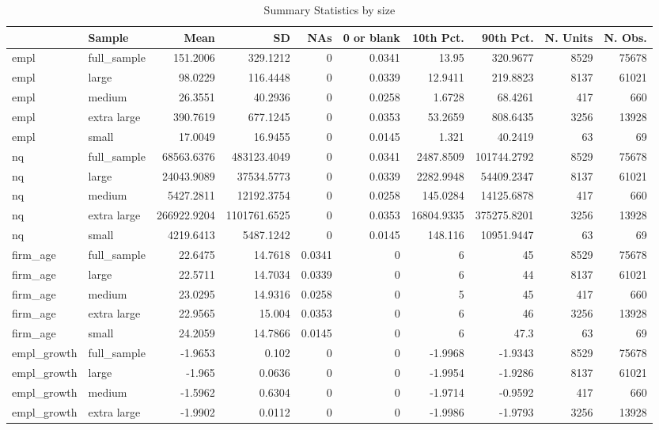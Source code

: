 \begin{table}[h]
  \caption{Summary Statistics by size }
  \centering
\begin{tabular}{l lr r r r r r r r}
\hline
 & Sample &Mean &SD &NAs &0 or blank &10th Pct. &90th Pct. &N. Units &N. Obs.\\
\hline
empl & full\_sample & 151.2006 & 329.1212 & 0 & 0.0341 & 13.95 & 320.9677 & 8529&75678\\
empl & large & 98.0229 & 116.4448 & 0 & 0.0339 & 12.9411 & 219.8823 & 8137&61021\\
empl & medium & 26.3551 & 40.2936 & 0 & 0.0258 & 1.6728 & 68.4261 & 417&660\\
empl & extra large & 390.7619 & 677.1245 & 0 & 0.0353 & 53.2659 & 808.6435 & 3256&13928\\
empl & small & 17.0049 & 16.9455 & 0 & 0.0145 & 1.321 & 40.2419 & 63&69\\
\hline
nq & full\_sample & 68563.6376 & 483123.4049 & 0 & 0.0341 & 2487.8509 & 101744.2792 & 8529&75678\\
nq & large & 24043.9089 & 37534.5773 & 0 & 0.0339 & 2282.9948 & 54409.2347 & 8137&61021\\
nq & medium & 5427.2811 & 12192.3754 & 0 & 0.0258 & 145.0284 & 14125.6878 & 417&660\\
nq & extra large & 266922.9204 & 1101761.6525 & 0 & 0.0353 & 16804.9335 & 375275.8201 & 3256&13928\\
nq & small & 4219.6413 & 5487.1242 & 0 & 0.0145 & 148.116 & 10951.9447 & 63&69\\
\hline
firm\_age & full\_sample & 22.6475 & 14.7618 & 0.0341 & 0 & 6 & 45 & 8529&75678\\
firm\_age & large & 22.5711 & 14.7034 & 0.0339 & 0 & 6 & 44 & 8137&61021\\
firm\_age & medium & 23.0295 & 14.9316 & 0.0258 & 0 & 5 & 45 & 417&660\\
firm\_age & extra large & 22.9565 & 15.004 & 0.0353 & 0 & 6 & 46 & 3256&13928\\
firm\_age & small & 24.2059 & 14.7866 & 0.0145 & 0 & 6 & 47.3 & 63&69\\
\hline
empl\_growth & full\_sample & -1.9653 & 0.102 & 0 & 0 & -1.9968 & -1.9343 & 8529&75678\\
empl\_growth & large & -1.965 & 0.0636 & 0 & 0 & -1.9954 & -1.9286 & 8137&61021\\
empl\_growth & medium & -1.5962 & 0.6304 & 0 & 0 & -1.9714 & -0.9592 & 417&660\\
empl\_growth & extra large & -1.9902 & 0.0112 & 0 & 0 & -1.9986 & -1.9793 & 3256&13928\\

\end{tabular}
\end{table}

